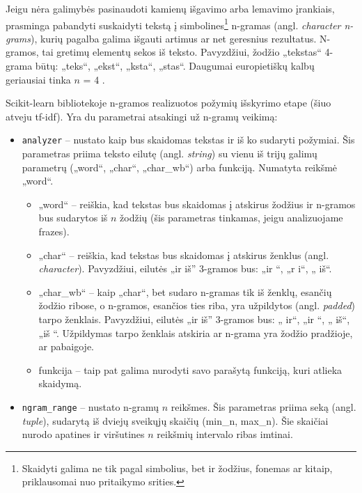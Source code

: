 \documentclass{VUMIFInfBakalaurinis}
\begin{document}
\label{ngram}

Jeigu nėra galimybės pasinaudoti kamienų išgavimo arba lemavimo
įrankiais, prasminga pabandyti suskaidyti tekstą į simbolines\footnote{Skaidyti
  galima ne tik pagal simbolius, bet ir žodžius, fonemas ar kitaip,
  priklausomai nuo pritaikymo srities.} n-gramas (angl. \emph{character
n-grams}), kurių pagalba galima išgauti artimus ar net geresnius
rezultatus. N-gramos, tai gretimų elementų sekos iš teksto. Pavyzdžiui,
žodžio „tekstas“ 4-grama būtų: „teks“, „ekst“, „ksta“, „stas“.
Daugumai europietiškų kalbų geriausiai tinka $n$ = 4 \cite{mcnamee2008don}.

Scikit-learn bibliotekoje n-gramos realizuotos požymių išskyrimo etape
(šiuo atveju tf-idf). Yra du parametrai atsakingi už n-gramų veikimą:

\begin{itemize}
\item
  \texttt{analyzer} -- nustato kaip bus skaidomas tekstas ir iš ko
  sudaryti požymiai. Šis parametras priima teksto eilutę (angl.
  \emph{string}) su vienu iš trijų galimų parametrų („word“, „char“,
  „char\_wb“) arba funkciją. Numatyta reikšmė „word“.

  \begin{itemize}
  \item
    „word“ -- reiškia, kad tekstas bus skaidomas į atskirus žodžius ir
    n-gramos bus sudarytos iš $n$ žodžių (šis parametras tinkamas,
    jeigu analizuojame frazes).
  \item
    „char“ -- reiškia, kad tekstas bus skaidomas į atskirus ženklus
    (angl. \emph{character}). Pavyzdžiui, eilutės „ir iš'' 3-gramos bus:
    „ir “, „r i“, „ iš“.
  \item
    „char\_wb“ -- kaip „char“, bet sudaro n-gramas tik iš ženklų,
    esančių žodžio ribose, o n-gramos, esančios ties riba, yra
    užpildytos (angl. \emph{padded}) tarpo ženklais. Pavyzdžiui, eilutės
    „ir iš'' 3-gramos bus: „ ir“, „ir “, „ iš“, „iš “. Užpildymas
    tarpo ženklais atskiria ar n-grama yra žodžio pradžioje, ar
    pabaigoje.
  \item
    funkcija -- taip pat galima nurodyti savo parašytą funkciją, kuri
    atlieka skaidymą.
  \end{itemize}
\item
  \texttt{ngram\_range} -- nustato n-gramų $n$ reikšmes. Šis
  parametras priima seką (angl. \emph{tuple}), sudarytą iš dviejų
  sveikųjų skaičių (min\_n, max\_n). Šie skaičiai nurodo apatines ir
  viršutines $n$ reikšmių intervalo ribas imtinai.
\end{itemize}
\end{document}
